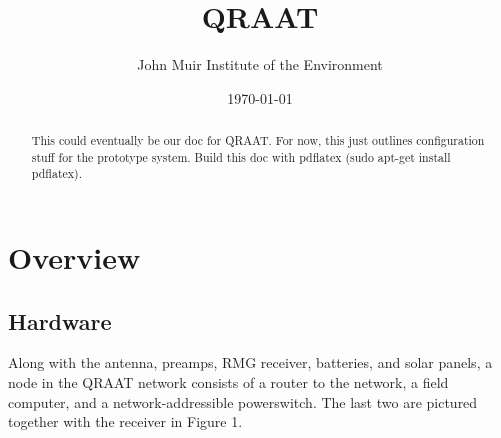 \documentclass[letter]{article}
\author{John Muir Institute of the Environment}
\date{\today}
\title{QRAAT}
\begin{document}
\maketitle

\begin{abstract}
This could eventually be our doc for QRAAT. For now, this just outlines configuration 
stuff for the prototype system. Build this doc with pdflatex (sudo apt-get install pdflatex). 
\end{abstract}

\tableofcontents
\pagebreak

\section{Overview} 
\subsection{Hardware}

Along with the antenna, preamps, RMG receiver, batteries, and solar panels, a node 
in the QRAAT network consists of a router to the network, a field computer, and a network-addressible 
powerswitch. The last two are pictured together with the receiver in Figure 1. 
\end{document}
